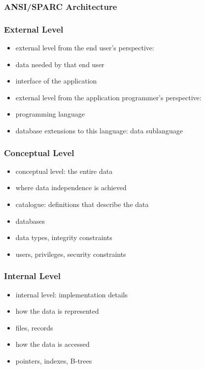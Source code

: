\documentclass[dvipsnames]{beamer}
\theoremstyle{plain}
\begin{document}
\begin{frame}
  \frametitle{ANSI/SPARC Architecture}

  \begin{center}
  \end{center}
\end{frame}

\begin{frame}
  \frametitle{External Level}

  \begin{itemize}
    \item external level from the end user's perspective:
    \item data needed by that end user
    \item interface of the application

    \pause
    \bigskip
    \item external level from the application programmer's perspective:
    \item programming language
    \item database extensions to this language: \alert{data sublanguage}
  \end{itemize}
\end{frame}

\begin{frame}
  \frametitle{Conceptual Level}

  \begin{itemize}
    \item conceptual level: the entire data
    \item where data independence is achieved

    \bigskip
    \item \alert{catalogue}: definitions that describe the data
    \item databases
    \item data types, integrity constraints
    \item users, privileges, security constraints
  \end{itemize}
\end{frame}

\begin{frame}
  \frametitle{Internal Level}

  \begin{itemize}
    \item internal level: implementation details

    \medskip
    \item how the data is represented
    \item files, records

    \smallskip
    \item how the data is accessed
    \item pointers, indexes, B-trees
  \end{itemize}
\end{frame}
\end{document}
